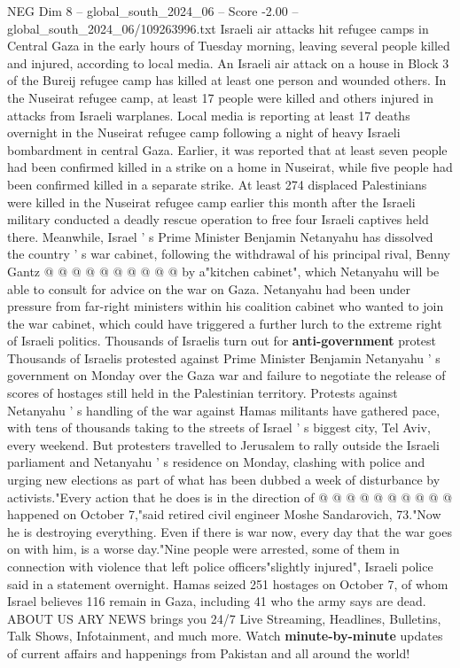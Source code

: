 \begin{textsample}{NEG Dim 8 – global\_south\_2024\_06 – Score -2.00 – global\_south\_2024\_06/109263996.txt}  \label{ex:f8_neg_038}
Israeli air attacks hit refugee camps in Central Gaza in the early hours of Tuesday morning, leaving several people killed and injured, according to local media.
An Israeli air attack on a house in Block 3 of the Bureij refugee camp has killed at least one person and wounded others.
In the Nuseirat refugee camp, at least 17 people were killed and others injured in attacks from Israeli warplanes.
Local media is reporting at least 17 deaths overnight in the Nuseirat refugee camp following a night of heavy Israeli bombardment in central Gaza.
Earlier, it was reported that at least seven people had been confirmed killed in a strike on a home in Nuseirat, while five people had been confirmed killed in a separate strike.
At least 274 displaced Palestinians were killed in the Nuseirat refugee camp earlier this month after the Israeli military conducted a deadly rescue operation to free four Israeli captives held there.
Meanwhile, Israel ' s Prime Minister Benjamin Netanyahu has dissolved the country ' s war cabinet, following the withdrawal of his principal rival, Benny Gantz @ @ @ @ @ @ @ @ @ @ by a"kitchen cabinet", which Netanyahu will be able to consult for advice on the war on Gaza.
Netanyahu had been under pressure from far-right ministers within his coalition cabinet who wanted to join the war cabinet, which could have triggered a further lurch to the extreme right of Israeli politics.
Thousands of Israelis turn out for \textbf{anti-government} protest Thousands of Israelis protested against Prime Minister Benjamin Netanyahu ' s government on Monday over the Gaza war and failure to negotiate the release of scores of hostages still held in the Palestinian territory.
Protests against Netanyahu ' s handling of the war against Hamas militants have gathered pace, with tens of thousands taking to the streets of Israel ' s biggest city, Tel Aviv, every weekend.
But protesters travelled to Jerusalem to rally outside the Israeli parliament and Netanyahu ' s residence on Monday, clashing with police and urging new elections as part of what has been dubbed a week of disturbance by activists."Every action that he does is in the direction of @ @ @ @ @ @ @ @ @ @ happened on October 7,"said retired civil engineer Moshe Sandarovich, 73."Now he is destroying everything.
Even if there is war now, every day that the war goes on with him, is a worse day."Nine people were arrested, some of them in connection with violence that left police officers"slightly injured", Israeli police said in a statement overnight.
Hamas seized 251 hostages on October 7, of whom Israel believes 116 remain in Gaza, including 41 who the army says are dead.
ABOUT US ARY NEWS brings you 24/7 Live Streaming, Headlines, Bulletins, Talk Shows, Infotainment, and much more.
Watch \textbf{minute-by-minute} updates of current affairs and happenings from Pakistan and all around the world!

\end{textsample}
